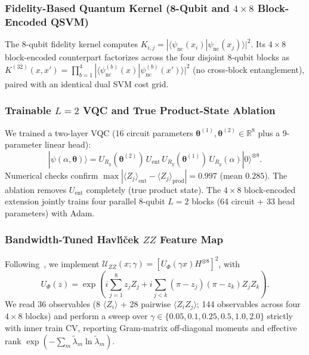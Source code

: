 \documentclass[conference]{IEEEtran}
\begin{document}
\subsubsection{Fidelity-Based Quantum Kernel (8-Qubit and $4 \times 8$ Block-Encoded QSVM)}
The 8-qubit fidelity kernel computes $K_{i,j} = |\langle \psi_{\text{nc}}(x_i) | \psi_{\text{nc}}(x_j) \rangle|^2$. Its $4 \times 8$ block-encoded counterpart factorizes across the four disjoint 8-qubit blocks as $K^{(32)}(x, x') = \prod_{b=1}^{4} |\langle \psi_{\text{nc}}^{(b)}(x) | \psi_{\text{nc}}^{(b)}(x') \rangle|^2$ (no cross-block entanglement), paired with an identical dual SVM cost grid.

\subsubsection{Trainable $L=2$ VQC and True Product-State Ablation}
We trained a two-layer VQC (16 circuit parameters $\boldsymbol{\theta}^{(1)}, \boldsymbol{\theta}^{(2)} \in \mathbb{R}^8$ plus a 9-parameter linear head):
\begin{equation}
|\psi(\alpha, \boldsymbol{\theta})\rangle = U_{R_y}(\boldsymbol{\theta}^{(2)})\, U_{\text{ent}}\, U_{R_y}(\boldsymbol{\theta}^{(1)})\, U_{R_y}(\alpha)|0\rangle^{\otimes 8}.
\end{equation}
Numerical checks confirm $\max|\langle Z_j\rangle_{\text{ent}} - \langle Z_j\rangle_{\text{prod}}| = 0.997$ (mean $0.285$). The ablation removes $U_{\text{ent}}$ completely (true product state). The $4 \times 8$ block-encoded extension jointly trains four parallel 8-qubit $L=2$ blocks (64 circuit + 33 head parameters) with Adam.

\subsubsection{Bandwidth-Tuned Havl{\'\i}{\v{c}}ek $ZZ$ Feature Map}
Following~\cite{havlicek2019supervised}, we implement $\mathcal{U}_{ZZ}(x; \gamma) = \left[ U_{\Phi}(\gamma x) H^{\otimes 8} \right]^2$, with
\begin{equation}
U_{\Phi}(z) = \exp\!\left( i \sum_{j=1}^8 z_j Z_j + i \sum_{j < k} (\pi - z_j)(\pi - z_k) Z_j Z_k \right).
\label{eq:zz_unitary}
\end{equation}
We read 36 observables (8 $\langle Z_i\rangle$ + 28 pairwise $\langle Z_i Z_j\rangle$; 144 observables across four $4 \times 8$ blocks) and perform a sweep over $\gamma \in \{0.05, 0.1, 0.25, 0.5, 1.0, 2.0\}$ strictly with inner train CV, reporting Gram-matrix off-diagonal moments and effective rank $\exp(-\sum_m \tilde{\lambda}_m \ln \tilde{\lambda}_m)$.
\end{document}
